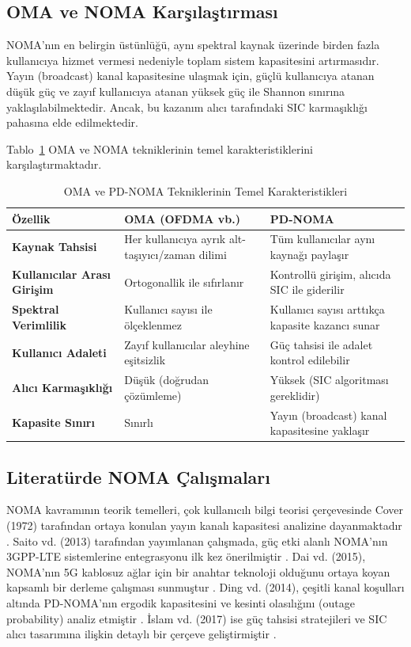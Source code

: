\subsection{OMA ve NOMA Karşılaştırması}
NOMA'nın en belirgin üstünlüğü, aynı spektral kaynak üzerinde birden fazla kullanıcıya hizmet vermesi nedeniyle toplam sistem kapasitesini artırmasıdır. Yayın (broadcast) kanal kapasitesine ulaşmak için, güçlü kullanıcıya atanan düşük güç ve zayıf kullanıcıya atanan yüksek güç ile Shannon sınırına yaklaşılabilmektedir. Ancak, bu kazanım alıcı tarafındaki SIC karmaşıklığı pahasına elde edilmektedir.

Tablo~\ref{tab:oma_noma_comp} OMA ve NOMA tekniklerinin temel karakteristiklerini karşılaştırmaktadır.

\begin{table}[htbp]
\caption{OMA ve PD-NOMA Tekniklerinin Temel Karakteristikleri}
\label{tab:oma_noma_comp}
\centering
\begin{tabular}{p{2.3cm}p{2.6cm}p{2.7cm}}
\toprule
\textbf{Özellik} & \textbf{OMA (OFDMA vb.)} & \textbf{PD-NOMA} \\
\midrule
\textbf{Kaynak Tahsisi} & Her kullanıcıya ayrık alt-taşıyıcı/zaman dilimi & Tüm kullanıcılar aynı kaynağı paylaşır \\
\textbf{Kullanıcılar Arası Girişim} & Ortogonallik ile sıfırlanır & Kontrollü girişim, alıcıda SIC ile giderilir \\
\textbf{Spektral Verimlilik} & Kullanıcı sayısı ile ölçeklenmez & Kullanıcı sayısı arttıkça kapasite kazancı sunar \\
\textbf{Kullanıcı Adaleti} & Zayıf kullanıcılar aleyhine eşitsizlik & Güç tahsisi ile adalet kontrol edilebilir \\
\textbf{Alıcı Karmaşıklığı} & Düşük (doğrudan çözümleme) & Yüksek (SIC algoritması gereklidir) \\
\textbf{Kapasite Sınırı} & Sınırlı & Yayın (broadcast) kanal kapasitesine yaklaşır \\
\bottomrule
\end{tabular}
\end{table}

\subsection{Literatürde NOMA Çalışmaları}
NOMA kavramının teorik temelleri, çok kullanıcılı bilgi teorisi çerçevesinde Cover (1972) tarafından ortaya konulan yayın kanalı kapasitesi analizine dayanmaktadır \cite{cover1972broadcast}. Saito vd. (2013) tarafından yayımlanan çalışmada, güç etki alanlı NOMA'nın 3GPP-LTE sistemlerine entegrasyonu ilk kez önerilmiştir \cite{saito2013non}. Dai vd. (2015), NOMA'nın 5G kablosuz ağlar için bir anahtar teknoloji olduğunu ortaya koyan kapsamlı bir derleme çalışması sunmuştur \cite{dai2015non}. Ding vd. (2014), çeşitli kanal koşulları altında PD-NOMA'nın ergodik kapasitesini ve kesinti olasılığını (outage probability) analiz etmiştir \cite{ding2014performance}. İslam vd. (2017) ise güç tahsisi stratejileri ve SIC alıcı tasarımına ilişkin detaylı bir çerçeve geliştirmiştir \cite{islam2017power}.

